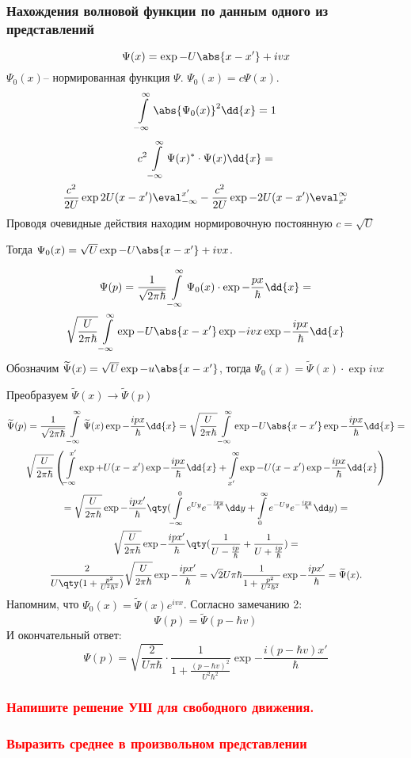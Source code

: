 \subsubsection{Нахождения волновой функции по данным одного из представлений}

$$\Psi(x)= \exp{-U\abs{x-x'} +ivx  }$$
$\Psi_0(x)$-- нормированная функция $\Psi$. $\Psi_0(x)=c\Psi(x)$.
$$\infint \abs{\Psi_0(x)}^2 \dd{x}=1$$
\begin{gather*}
	c^2\infint \Psi(x)^*\cdot\Psi(x)\dd{x}=
	\\ \frac{c^2}{2U}\exp{2U(x-x')}\eval_{-\infty}^{x'}- 
	\frac{c^2}{2U}\exp{-2U(x-x')}
	\eval^{\infty}_{x'}
\end{gather*}
Проводя очевидные действия находим нормировочную постоянную $c=\sqrt{U}$

Тогда $\Psi_0(x)=\sqrt{U}\exp{-U\abs{x-x'}+ivx}$.

\begin{gather*}
\Psi(p)=\frac{1}{\sqrt{2\pi\hbar}}\infint \Psi_0(x)\cdot\exp{-\frac{px}{\hbar}} \dd{x}=\\
\sqrt\frac{U}{2 \pi \hbar } \infint \exp{-U\abs{x-x'}}\exp{-ivx}\exp{-\frac{ipx}{\hbar}} \dd{x}
\end{gather*}
Обозначим $\tilde{\Psi}(x)=\sqrt{U} \exp{-u\abs{x-x'}}$,
 тогда $\Psi_0(x)=\tilde{\Psi}(x)\cdot\exp{ivx}$

Преобразуем $\tilde{\Psi}(x)\longrightarrow \tilde{\Psi}(p)$ 
\begin{gather*}
	\tilde{\Psi}(p)=\frac{1}{\sqrt{2\pi\hbar}}\infint\tilde\Psi(x)\exp{-\frac{ipx}{\hbar}} \dd{x} =\sqrt{\frac{U}{2 \pi \hbar}} \infint \exp{-U\abs{x-x'}}\exp{-\frac{ipx}{\hbar}}\dd{x} =\\
	\sqrt{\frac{U}{2 \pi \hbar}} \left(
	\int\limits_{-\infty}^{x'} \exp{+U (x-x')}\exp{-\frac{ipx}{\hbar}}\dd{x} 
	+
	\int\limits^{\infty}_{x'} \exp{-U (x-x')}\exp{-\frac{ipx}{\hbar}}\dd{x}
	\right)\\=
	\sqrt{\frac{U}{2 \pi \hbar }}\exp{-\frac{ipx' }{\hbar}}
	\qty
	(\int\limits_{-\infty}^0 e^{Uy} e^{-\frac{ipy}{\hbar}}\dd y+
	\int\limits^{\infty}_0 e^{-Uy} e^{-\frac{ipy}{\hbar}}\dd y
	 )
	 =\\
	 \sqrt{\frac{U}{2 \pi \hbar}} \exp{-\frac{ipx' }{\hbar}} 
	 \qty(\frac{1}{U-\frac{ip}{\hbar}} + \frac{1}{U+\frac{ip}{\hbar}})=\\
	 \frac{2}{U\qty(1+\frac{p^2}{U^2\hbar^2})}\sqrt{\frac{U}{2 \pi \hbar}} \exp{-\frac{ipx'}{\hbar}}=\sqrt{2}{U \pi \hbar} \frac{1}{1+\frac{p^2}{U^2\hbar^2}}\exp{-\frac{ipx' }{\hbar}}=\tilde {\Psi}(x). 
\end{gather*}
Напомним, что $\Psi_0(x)=\tilde\Psi(x)e^{ivx}$. Согласно замечанию 2:
	 $$\Psi(p)=\tilde{\Psi}(p-\hbar v)$$
И окончательный ответ:
	 $$\Psi(p)=\sqrt{\frac{2}{U\pi\hbar}}\cdot\frac{1}{1+\frac{(p-\hbar v)^2}{U^2\hbar^2}}\exp{-\frac{i(p-\hbar v)x' }{\hbar}} $$
\subsubsection{\textcolor{red} {Напишите решение УШ для свободного движения.} }

\subsubsection{\textcolor{red} {Выразить среднее в произвольном представлении} }